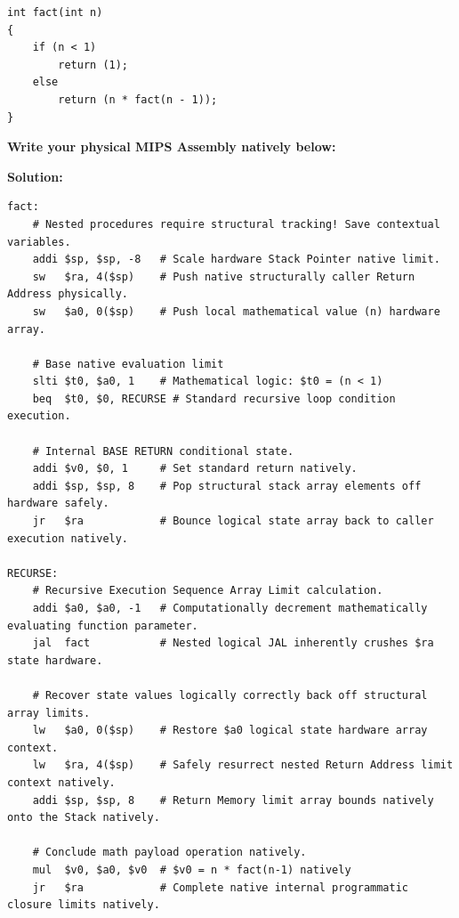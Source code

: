 \documentclass[letterpaper]{report}
\begin{document}
\begin{center}
\lstset{language=C,basicstyle=\ttfamily, numbers=none, gobble=0}
\begin{lstlisting}[frame=single]
int fact(int n)
{
    if (n < 1)
        return (1);
    else
        return (n * fact(n - 1));
}
\end{lstlisting}
\end{center}

\vspace{0.2in}
\textbf{Write your physical MIPS Assembly natively below:}

{\color{red} \textbf{Solution:}}
\begin{center}
\begin{lstlisting}[frame=single]
fact:
    # Nested procedures require structural tracking! Save contextual variables.
    addi $sp, $sp, -8   # Scale hardware Stack Pointer native limit.
    sw   $ra, 4($sp)    # Push native structurally caller Return Address physically.
    sw   $a0, 0($sp)    # Push local mathematical value (n) hardware array.

    # Base native evaluation limit 
    slti $t0, $a0, 1    # Mathematical logic: $t0 = (n < 1)
    beq  $t0, $0, RECURSE # Standard recursive loop condition execution.
    
    # Internal BASE RETURN conditional state.
    addi $v0, $0, 1     # Set standard return natively.
    addi $sp, $sp, 8    # Pop structural stack array elements off hardware safely.
    jr   $ra            # Bounce logical state array back to caller execution natively.

RECURSE:
    # Recursive Execution Sequence Array Limit calculation.
    addi $a0, $a0, -1   # Computationally decrement mathematically evaluating function parameter.
    jal  fact           # Nested logical JAL inherently crushes $ra state hardware.
    
    # Recover state values logically correctly back off structural array limits.
    lw   $a0, 0($sp)    # Restore $a0 logical state hardware array context.
    lw   $ra, 4($sp)    # Safely resurrect nested Return Address limit context natively.
    addi $sp, $sp, 8    # Return Memory limit array bounds natively onto the Stack natively.
    
    # Conclude math payload operation natively.
    mul  $v0, $a0, $v0  # $v0 = n * fact(n-1) natively
    jr   $ra            # Complete native internal programmatic closure limits natively.
\end{lstlisting}
\end{center}
\end{document}
